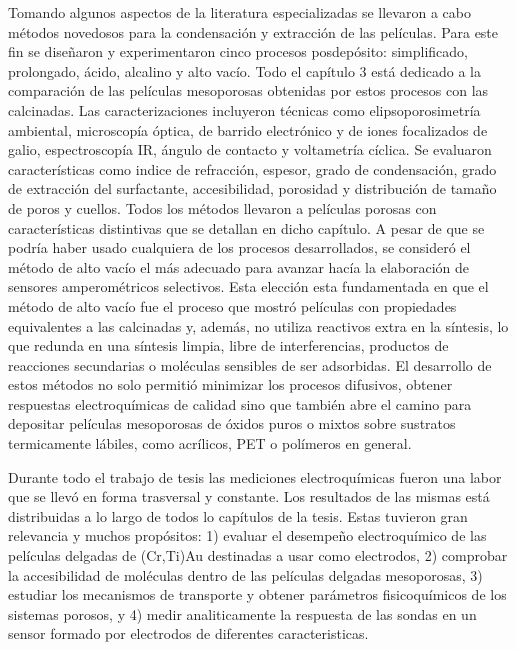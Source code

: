 Tomando algunos aspectos de la literatura especializadas se llevaron a cabo métodos novedosos para la condensación y extracción de las películas. Para este fin se diseñaron y experimentaron cinco procesos posdepósito: simplificado, prolongado, ácido, alcalino y alto vacío. Todo el capítulo 3 está dedicado a la comparación de las películas mesoporosas obtenidas por estos procesos con las calcinadas. Las caracterizaciones incluyeron técnicas como elipsoporosimetría ambiental, microscopía óptica, de barrido electrónico y de iones focalizados de galio, espectroscopía IR, ángulo de contacto y voltametría cíclica. Se evaluaron características como indice de refracción, espesor, grado de condensación, grado de extracción del surfactante, accesibilidad, porosidad y distribución de tamaño de poros y cuellos. Todos los métodos llevaron a películas porosas con características distintivas que se detallan en dicho capítulo. A pesar de que se podría haber usado cualquiera de los procesos desarrollados, se consideró el método de alto vacío el más adecuado para avanzar hacía la elaboración de sensores amperométricos selectivos. Esta elección esta fundamentada en que el método de alto vacío fue el proceso que mostró películas con propiedades equivalentes a las calcinadas y, además, no utiliza reactivos extra en la síntesis, lo que redunda en una síntesis limpia, libre de interferencias, productos de reacciones secundarias o moléculas sensibles de ser adsorbidas. El desarrollo de estos métodos no solo permitió minimizar los procesos difusivos, obtener respuestas electroquímicas de calidad sino que también abre el camino para depositar películas mesoporosas de óxidos puros o mixtos sobre sustratos termicamente lábiles, como acrílicos, PET o polímeros en general.

Durante todo el trabajo de tesis las mediciones electroquímicas fueron una labor que se llevó en forma trasversal y constante. Los resultados de las mismas está distribuidas a lo largo de todos lo capítulos de la tesis. Estas tuvieron gran relevancia y muchos propósitos: 1) evaluar el desempeño electroquímico de las películas delgadas de (Cr,Ti)\textbar Au destinadas a usar como electrodos, 2) comprobar la accesibilidad de moléculas dentro de las películas delgadas mesoporosas, 3) estudiar los mecanismos de transporte y obtener parámetros fisicoquímicos de los sistemas porosos, y 4) medir analiticamente la respuesta de las sondas en un sensor formado por electrodos de diferentes caracteristicas.

